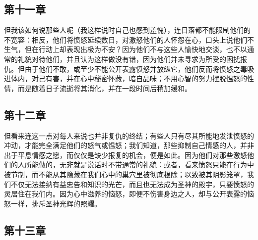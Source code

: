 
\subsection{第十一章}

\par

但我该如何说那些人呢（我这样说时自己也感到羞愧），连日落都不能限制他们的不宽容：相反，他们将愤怒延续数日，对激怒他们的人怀怨在心，口头上说他们不生气，但在行动上却表现出极为不安？因为他们不与这些人愉快地交谈，也不以通常的礼貌对待他们，并且认为这样做没有错，因为他们并未寻求为所受的困扰报仇。但由于他们不敢，或至少不能公开表露愤怒并放纵它，他们反而将愤怒之毒吸进体内，对己有害，并在心中秘密怀藏，暗自品味；不用心智的努力摆脱愠怒的性情，而是随着日子流逝将其消化，并在一段时间后稍加缓和。\par


\subsection{第十二章}

\par

但看来连这一点对每人来说也并非复仇的终结；有些人只有尽其所能地发泄愤怒的冲动，才能完全满足他们的怒气或愠怒；我们知道，那些抑制自己情感的人，并非出于平息情感之愿，而仅仅是缺少报复的机会，便是如此。因为他们对那些激怒他们的人所能做的，无非就是说话时不带通常的礼貌：或者，看来愤怒只能在行为中被节制，而不能从其隐藏在我们心中的巢穴里被彻底根除；以致被其阴影笼罩，我们不仅无法接纳有益忠告和知识的光芒，而且也无法成为圣神的殿宇，只要愤怒的灵居住在我们内。因为心中滋养的恼怒，即便不伤害身边之人，却与公开表露的恼怒一样，排斥圣神光辉的照耀。\par


\subsection{第十三章}

\par

